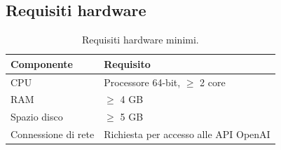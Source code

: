 \documentclass[a4paper, 11pt, oneside]{scrartcl}
\begin{document}
\subsection{Requisiti hardware}
\begin{table}[H]
    \centering
    \renewcommand{\arraystretch}{1.2}
    \begin{tabularx}{\textwidth}{@{}lX@{}}
        \toprule
        \textbf{Componente} & \textbf{Requisito} \\
        \midrule
        CPU & Processore 64-bit, $\geq$ 2 core \\
        RAM & $\geq$ 4 GB \\
        Spazio disco & $\geq$ 5 GB \\
        Connessione di rete & Richiesta per accesso alle API OpenAI \\
        \bottomrule
    \end{tabularx}
    \caption{Requisiti hardware minimi.}
\end{table}

\newpage
%

\newpage
%

\newpage
%

\newpage
%

\newpage
%

\newpage
%

\newpage
%

\newpage
%
\end{document}
